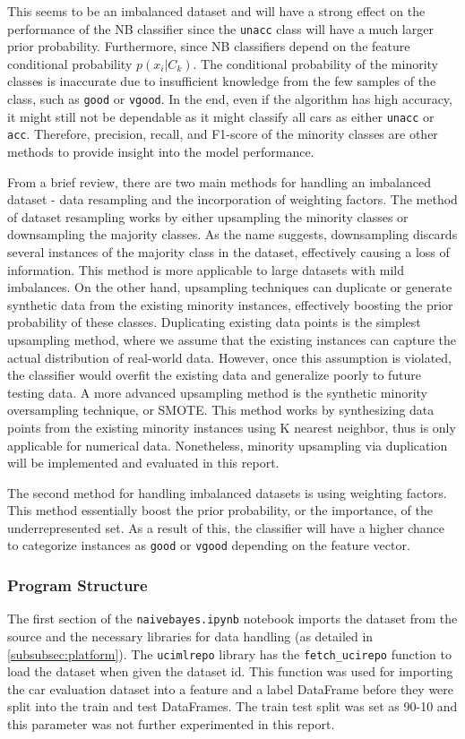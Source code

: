 \documentclass[a4paper]{article}
\begin{document}
This seems to be an imbalanced dataset and will have a strong effect on the performance of the NB classifier since the \lstinline{unacc} class will have a much larger prior probability. Furthermore, since NB classifiers depend on the feature conditional probability $p(x_i|C_k)$. The conditional probability of the minority classes is inaccurate due to insufficient knowledge from the few samples of the class, such as \lstinline{good} or \lstinline{vgood}. In the end, even if the algorithm has high accuracy, it might still not be dependable as it might classify all cars as either \lstinline{unacc} or \lstinline{acc}. Therefore, precision, recall, and F1-score of the minority classes are other methods to provide insight into the model performance.

From a brief review, there are two main methods for handling an imbalanced dataset - data resampling and the incorporation of weighting factors.
The method of dataset resampling works by either upsampling the minority classes or downsampling the majority classes. As the name suggests, downsampling discards several instances of the majority class in the dataset, effectively causing a loss of information. This method is more applicable to large datasets with mild imbalances. On the other hand, upsampling techniques can duplicate or generate synthetic data from the existing minority instances, effectively boosting the prior probability of these classes. Duplicating existing data points is the simplest upsampling method, where we assume that the existing instances can capture the actual distribution of real-world data. However, once this assumption is violated, the classifier would overfit the existing data and generalize poorly to future testing data. A more advanced upsampling method is the synthetic minority oversampling technique, or SMOTE. This method works by synthesizing data points from the existing minority instances using K nearest neighbor, thus is only applicable for numerical data. Nonetheless, minority upsampling via duplication will be implemented and evaluated in this report.

The second method for handling imbalanced datasets is using weighting factors. This method essentially boost the prior probability, or the importance, of the underrepresented set. As a result of this, the classifier will have a higher chance to categorize instances as \lstinline{good} or \lstinline{vgood} depending on the feature vector.

\subsubsection{Program Structure}
The first section of the \lstinline{naivebayes.ipynb} notebook imports the dataset from the source and the necessary libraries for data handling (as detailed in \ref{subsubsec:platform}). The \lstinline{ucimlrepo} library has the \lstinline{fetch_ucirepo} function to load the dataset when given the dataset id. This function was used for importing the car evaluation dataset into a feature and a label DataFrame before they were split into the train and test DataFrames. The train test split was set as 90-10 and this parameter was not further experimented in this report.
\end{document}
